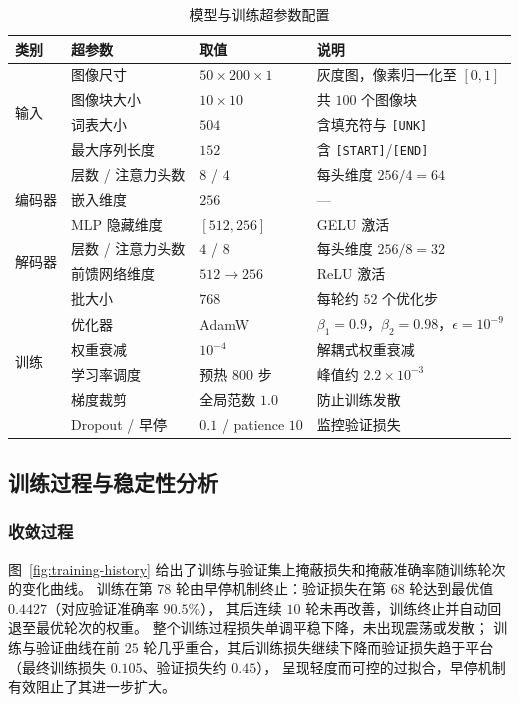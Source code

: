 \begin{table}[htbp]
    \centering
    \caption{模型与训练超参数配置}
    \begin{tabular}{llll}
        \toprule
        \textbf{类别} & \textbf{超参数} & \textbf{取值} & \textbf{说明} \\
        \midrule
        \multirow{4}{*}{输入}
        & 图像尺寸 & $50 \times 200 \times 1$ & 灰度图，像素归一化至 $[0,1]$ \\
        & 图像块大小 & $10 \times 10$ & 共 $100$ 个图像块 \\
        & 词表大小 & $504$ & 含填充符与 \texttt{[UNK]} \\
        & 最大序列长度 & $152$ & 含 \texttt{[START]}/\texttt{[END]} \\
        \midrule
        \multirow{3}{*}{编码器}
        & 层数 / 注意力头数 & $8$ / $4$ & 每头维度 $256/4=64$ \\
        & 嵌入维度 & $256$ & — \\
        & MLP 隐藏维度 & $[512, 256]$ & GELU 激活 \\
        \midrule
        \multirow{2}{*}{解码器}
        & 层数 / 注意力头数 & $4$ / $8$ & 每头维度 $256/8=32$ \\
        & 前馈网络维度 & $512 \to 256$ & ReLU 激活 \\
        \midrule
        \multirow{6}{*}{训练}
        & 批大小 & $768$ & 每轮约 $52$ 个优化步 \\
        & 优化器 & AdamW & $\beta_1{=}0.9$，$\beta_2{=}0.98$，$\epsilon{=}10^{-9}$ \\
        & 权重衰减 & $10^{-4}$ & 解耦式权重衰减 \\
        & 学习率调度 & 预热 $800$ 步 & 峰值约 $2.2\times10^{-3}$ \\
        & 梯度裁剪 & 全局范数 $1.0$ & 防止训练发散 \\
        & Dropout / 早停 & $0.1$ / patience $10$ & 监控验证损失 \\
        \bottomrule
    \end{tabular}
    \label{tab:hyperparams}
\end{table}

\subsection{训练过程与稳定性分析}
\subsubsection{收敛过程}
图~\ref{fig:training-history} 给出了训练与验证集上掩蔽损失和掩蔽准确率随训练轮次的变化曲线。
训练在第 $78$ 轮由早停机制终止：验证损失在第 $68$ 轮达到最优值 $0.4427$（对应验证准确率 $90.5\%$），
其后连续 $10$ 轮未再改善，训练终止并自动回退至最优轮次的权重。
整个训练过程损失单调平稳下降，未出现震荡或发散；
训练与验证曲线在前 $25$ 轮几乎重合，其后训练损失继续下降而验证损失趋于平台（最终训练损失 $0.105$、验证损失约 $0.45$），
呈现轻度而可控的过拟合，早停机制有效阻止了其进一步扩大。

